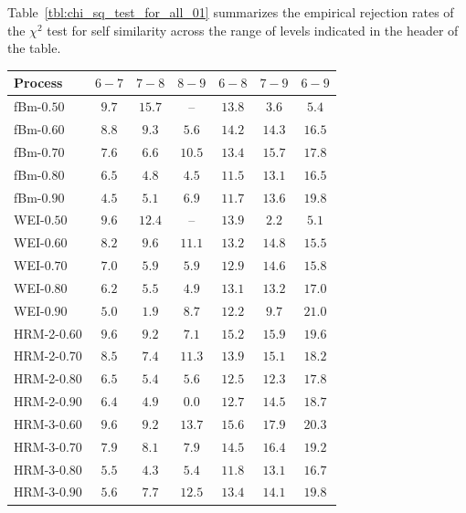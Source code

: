 \documentclass[a4paper]{article}
\begin{document}
Table~\ref{tbl:chi_sq_test_for_all_01} summarizes the empirical rejection rates of
the $\chi^2$ test for self similarity across the range of levels indicated in the
header of the table.
\begin{table}[h]\begin{center}
	\begin{tabular}{l||c|c|c|c|c|c|}
	Process 		& $6-7$ &  $7-8$ &  $8-9$ &  $6-8$ &  $7-9$ &  $6-9$ \\ \hline\hline
	  fBm-$0.50$	& $9.7$ & $15.7$ &     -- & $13.8$ &  $\mathbf{3.6}$ &  $5.4$ \\ \hline
	  fBm-$0.60$	& $8.8$ &  $9.3$ &  $\mathbf{5.6}$ & $14.2$ & $14.3$ & $16.5$ \\ \hline
	  fBm-$0.70$	& $7.6$ &  $\mathbf{6.6}$ & $10.5$ & $13.4$ & $15.7$ & $17.8$ \\ \hline
	  fBm-$0.80$	& $6.5$ &  $4.8$ &  $\mathbf{4.5}$ & $11.5$ & $13.1$ & $16.5$ \\ \hline
	  fBm-$0.90$	& $\mathbf{4.5}$ &  $5.1$ &  $6.9$ & $11.7$ & $13.6$ & $19.8$ \\ \hline\hline

	  WEI-$0.50$	& $9.6$ & $12.4$ &     -- & $13.9$ &  $\mathbf{2.2}$ &  $5.1$ \\ \hline
	  WEI-$0.60$	& $\mathbf{8.2}$ &  $9.6$ & $11.1$ & $13.2$ & $14.8$ & $15.5$ \\ \hline
	  WEI-$0.70$	& $7.0$ &  $\mathbf{5.9}$ &  $\mathbf{5.9}$ & $12.9$ & $14.6$ & $15.8$ \\ \hline
	  WEI-$0.80$	& $6.2$ &  $5.5$ &  $\mathbf{4.9}$ & $13.1$ & $13.2$ & $17.0$ \\ \hline
	  WEI-$0.90$	& $5.0$ &  $\mathbf{1.9}$ &  $8.7$ & $12.2$ &  $9.7$ & $21.0$ \\ \hline\hline

	HRM-2-$0.60$ 	& $9.6$ &  $9.2$ &  $\mathbf{7.1}$ & $15.2$ & $15.9$ & $19.6$ \\ \hline
	HRM-2-$0.70$ 	& $8.5$ &  $\mathbf{7.4}$ & $11.3$ & $13.9$ & $15.1$ & $18.2$ \\ \hline
	HRM-2-$0.80$ 	& $6.5$ &  $\mathbf{5.4}$ &  $5.6$ & $12.5$ & $12.3$ & $17.8$ \\ \hline
	HRM-2-$0.90$ 	& $6.4$ &  $\mathbf{4.9}$ &  $0.0$ & $12.7$ & $14.5$ & $18.7$ \\ \hline\hline

	HRM-3-$0.60$ 	& $9.6$ &  $\mathbf{9.2}$ & $13.7$ & $15.6$ & $17.9$ & $20.3$ \\ \hline
	HRM-3-$0.70$ 	& $\mathbf{7.9}$ &  $8.1$ &  $\mathbf{7.9}$ & $14.5$ & $16.4$ & $19.2$ \\ \hline
	HRM-3-$0.80$ 	& $5.5$ &  $\mathbf{4.3}$ &  $5.4$ & $11.8$ & $13.1$ & $16.7$ \\ \hline
	HRM-3-$0.90$ 	& $\mathbf{5.6}$ &  $7.7$ & $12.5$ & $13.4$ & $14.1$ & $19.8$ \\ \hline\hline


\end{tabular}
\end{center}
\end{table}
\end{document}
